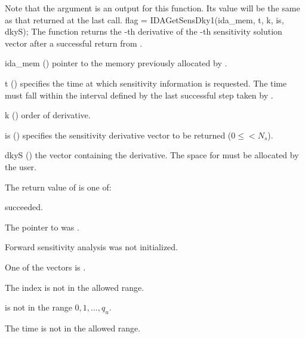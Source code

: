 {
  Note that the argument  is an output for this function. Its value will be
  the same as that returned at the last  call.
}
{
  flag = IDAGetSensDky1(ida\_mem, t, k, is, dkyS);
}
{
  The function  returns the -th derivative of the 
  -th sensitivity solution vector after a successful return from .
}
{
  \begin{args}
  \item[ida\_mem] ()
    pointer to the memory previously allocated by .
  \item[t] ()
    specifies the time at which sensitivity information is 
    requested. The time  must fall within the interval defined by the last 
    successful step taken by {\idas}.
  \item[k] () order of derivative.
  \item[is] () specifies the sensitivity derivative vector to be returned
    ($0\le$$< N_s$).
  \item[dkyS] ()
    the vector containing the derivative. The space for  must be allocated by 
    the user. 
  \end{args}
}
{
  The return value  of  is one of:
  \begin{args}
  \item[\Id{IDA\_SUCCESS}] 
     succeeded.
  \item[\Id{IDA\_MEM\_NULL}] 
    The pointer to  was .
  \item[\Id{IDA\_NO\_SENS}] 
    Forward sensitivity analysis was not initialized.
  \item[\Id{IDA\_BAD\_DKY}] 
    One of the vectors  is .
  \item[\Id{IDA\_BAD\_IS}]
    The index  is not in the allowed range.
  \item[\Id{IDA\_BAD\_K}] 
     is not in the range $0, 1, ..., q_u$.
  \item[\Id{IDA\_BAD\_T}] 
    The time  is not in the allowed range.
  \end{args}
}
{}

